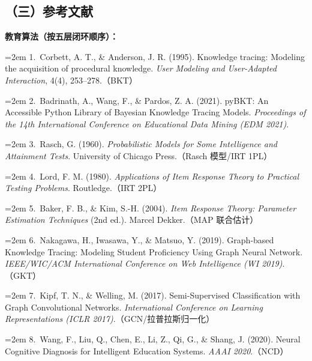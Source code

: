 \documentclass[zihao=-4,a4paper,UTF8,fontset=windows]{ctexart}
\begin{document}
\subsection{（三）参考文献}


\textbf{教育算法（按五层闭环顺序）：}



\noindent\hangindent=2em 1.~Corbett, A. T., \& Anderson, J. R. (1995). Knowledge tracing: Modeling the acquisition of procedural knowledge. \textit{User Modeling and User-Adapted Interaction}, 4(4), 253–278.（BKT）



\noindent\hangindent=2em 2.~Badrinath, A., Wang, F., \& Pardos, Z. A. (2021). pyBKT: An Accessible Python Library of Bayesian Knowledge Tracing Models. \textit{Proceedings of the 14th International Conference on Educational Data Mining (EDM 2021)}.



\noindent\hangindent=2em 3.~Rasch, G. (1960). \textit{Probabilistic Models for Some Intelligence and Attainment Tests}. University of Chicago Press.（Rasch 模型/IRT 1PL）



\noindent\hangindent=2em 4.~Lord, F. M. (1980). \textit{Applications of Item Response Theory to Practical Testing Problems}. Routledge.（IRT 2PL）



\noindent\hangindent=2em 5.~Baker, F. B., \& Kim, S.-H. (2004). \textit{Item Response Theory: Parameter Estimation Techniques} (2nd ed.). Marcel Dekker.（MAP 联合估计）



\noindent\hangindent=2em 6.~Nakagawa, H., Iwasawa, Y., \& Matsuo, Y. (2019). Graph-based Knowledge Tracing: Modeling Student Proficiency Using Graph Neural Network. \textit{IEEE/WIC/ACM International Conference on Web Intelligence (WI 2019)}.（GKT）



\noindent\hangindent=2em 7.~Kipf, T. N., \& Welling, M. (2017). Semi-Supervised Classification with Graph Convolutional Networks. \textit{International Conference on Learning Representations (ICLR 2017)}.（GCN/拉普拉斯归一化）



\noindent\hangindent=2em 8.~Wang, F., Liu, Q., Chen, E., Li, Z., Qi, G., \& Shang, J. (2020). Neural Cognitive Diagnosis for Intelligent Education Systems. \textit{AAAI 2020}.（NCD）
\end{document}
